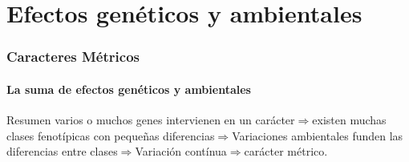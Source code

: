 \documentclass{beamer}
\newenvironment{caja}
{
\begin{beamerboxesrounded}[upper=upcol,lower=lowcol,shadow=true]}
{\end{beamerboxesrounded}}
\begin{document}
\section{Efectos genéticos y ambientales}

\begin{frame}
\frametitle{Caracteres Métricos}
\framesubtitle{La suma de efectos genéticos y ambientales}
\begin{caja}{Resumen}
varios o muchos genes intervienen en un carácter$\Rightarrow$existen muchas clases fenotípicas con pequeñas diferencias$\Rightarrow$Variaciones ambientales funden las diferencias entre clases$\Rightarrow$Variación contínua$\Rightarrow$carácter métrico.
\end{caja}
\end{frame}
\end{document}
